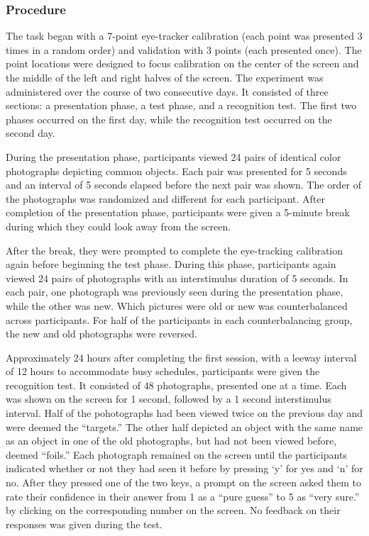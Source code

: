 \documentclass[
  english,
  man,floatsintext]{apa6}
\begin{document}
\hypertarget{procedure-2}{%
\subsubsection{Procedure}\label{procedure-2}}

The task began with a 7-point eye-tracker calibration (each point was presented 3 times in a random order) and validation with 3 points (each presented once). The point locations were designed to focus calibration on the center of the screen and the middle of the left and right halves of the screen. The experiment was administered over the course of two consecutive days. It consisted of three sections: a presentation phase, a test phase, and a recognition test. The first two phases occurred on the first day, while the recognition test occurred on the second day.

During the presentation phase, participants viewed 24 pairs of identical color photographs depicting common objects. Each pair was presented for 5 seconds and an interval of 5 seconds elapsed before the next pair was shown. The order of the photographs was randomized and different for each participant. After completion of the presentation phase, participants were given a 5-minute break during which they could look away from the screen.

After the break, they were prompted to complete the eye-tracking calibration again before beginning the test phase. During this phase, participants again viewed 24 pairs of photographs with an interstimulus duration of 5 seconds. In each pair, one photograph was previously seen during the presentation phase, while the other was new. Which pictures were old or new was counterbalanced across participants. For half of the participants in each counterbalancing group, the new and old photographs were reversed.

Approximately 24 hours after completing the first session, with a leeway interval of 12 hours to accommodate busy schedules, participants were given the recognition test. It consisted of 48 photographs, presented one at a time. Each was shown on the screen for 1 second, followed by a 1 second interstimulus interval. Half of the pohotographs had been viewed twice on the previous day and were deemed the ``targets.'' The other half depicted an object with the same name as an object in one of the old photographs, but had not been viewed before, deemed ``foils.'' Each photograph remained on the screen until the participants indicated whether or not they had seen it before by pressing `y' for yes and `n' for no. After they pressed one of the two keys, a prompt on the screen asked them to rate their confidence in their answer from 1 as a ``pure guess'' to 5 as ``very sure.'' by clicking on the corresponding number on the screen. No feedback on their responses was given during the test.
\end{document}
